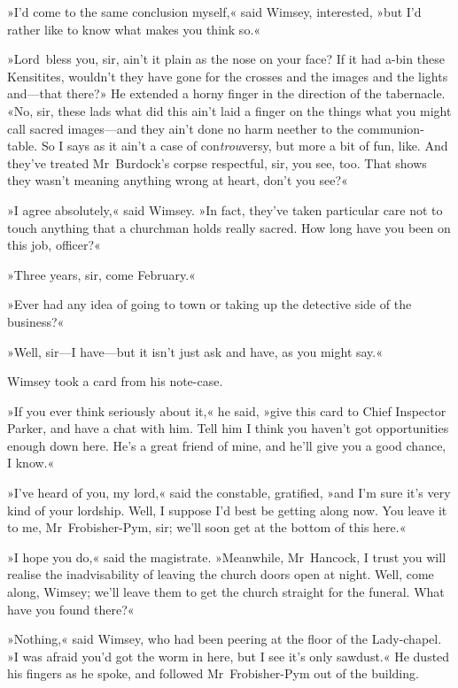 »I'd come to the same conclusion myself,« said Wimsey, interested, »but I'd rather like to know what makes you think so.«

»Lord~bless you, sir, ain't it plain as the nose on your face? If it had a-bin these Kensitites, wouldn't they have gone for the crosses and the images and the lights and—that there?» He extended a horny finger in the direction of the tabernacle. «No, sir, these lads what did this ain't laid a finger on the things what you might call sacred images—and they ain't done no harm neether to the communion-table. So I says as it ain't a case of con\textit{trou}versy, but more a bit of fun, like. And they've treated Mr~Burdock's corpse respectful, sir, you see, too. That shows they wasn't meaning anything wrong at heart, don't you see?«

»I agree absolutely,« said Wimsey. »In fact, they've taken particular care not to touch anything that a churchman holds really sacred. How long have you been on this job, officer?«

»Three years, sir, come February.«

»Ever had any idea of going to town or taking up the detective side of the business?«

»Well, sir—I have—but it isn't just ask and have, as you might say.«

Wimsey took a card from his note-case.

»If you ever think seriously about it,« he said, »give this card to Chief Inspector Parker, and have a chat with him. Tell him I think you haven't got opportunities enough down here. He's a great friend of mine, and he'll give you a good chance, I know.«

»I've heard of you, my lord,« said the constable, gratified, »and I'm sure it's very kind of your lordship. Well, I suppose I'd best be getting along now. You leave it to me, Mr~Frobisher-Pym, sir; we'll soon get at the bottom of this here.«

»I hope you do,« said the magistrate. »Meanwhile, Mr~Hancock, I trust you will realise the inadvisability of leaving the church doors open at night. Well, come along, Wimsey; we'll leave them to get the church straight for the funeral. What have you found there?«

»Nothing,« said Wimsey, who had been peering at the floor of the Lady-chapel. »I was afraid you'd got the worm in here, but I see it's only sawdust.« He dusted his fingers as he spoke, and followed Mr~Frobisher-Pym out of the building.

